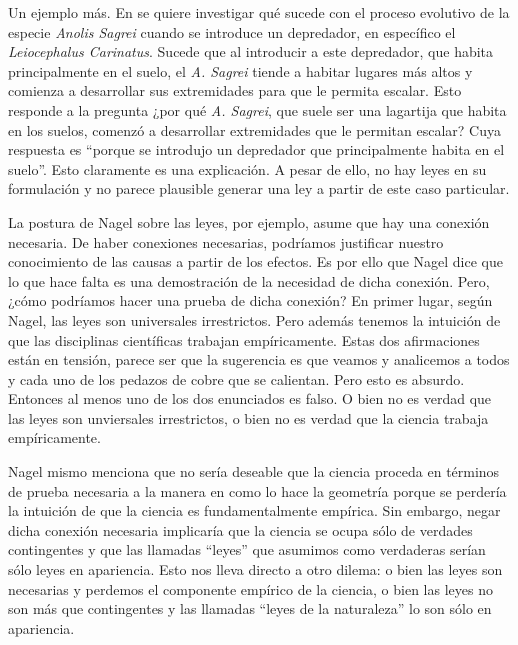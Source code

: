 Un ejemplo más. En \cite{Losos2004} se quiere investigar qué sucede con el proceso evolutivo de la especie \textit{Anolis Sagrei} cuando se introduce un depredador, en específico el \textit{Leiocephalus Carinatus}. Sucede que al introducir a este depredador, que habita principalmente en el suelo, el \textit{A. Sagrei} tiende a habitar lugares más altos y comienza a desarrollar sus extremidades para que le permita escalar. Esto responde a la pregunta ¿por qué \textit{A. Sagrei}, que suele ser una lagartija que habita en los suelos, comenzó a desarrollar extremidades que le permitan escalar? Cuya respuesta es ``porque se introdujo un depredador que principalmente habita en el suelo''. Esto claramente es una explicación. A pesar de ello, no hay leyes en su formulación y no parece plausible generar una ley a partir de este caso particular.

La postura de Nagel sobre las leyes, por ejemplo, asume que hay una conexión necesaria. De haber conexiones necesarias, podríamos justificar nuestro conocimiento de las causas a partir de los efectos. Es por ello que Nagel dice que lo que hace falta es una demostración de la necesidad de dicha conexión. Pero, ¿cómo podríamos hacer una prueba de dicha conexión? En primer lugar, según Nagel, las leyes son universales irrestrictos. Pero además tenemos la intuición de que las disciplinas científicas trabajan empíricamente. Estas dos afirmaciones están en tensión, parece ser que la sugerencia es que veamos y analicemos a todos y cada uno de los pedazos de cobre que se calientan. Pero esto es absurdo. Entonces al menos uno de los dos enunciados es falso. O bien no es verdad que las leyes son unviersales irrestrictos, o bien no es verdad que la ciencia trabaja empíricamente.

Nagel mismo menciona que no sería deseable que la ciencia proceda en términos de prueba necesaria a la manera en como lo hace la geometría \cite[cfr., p. 53]{Nagel2006} porque se perdería la intuición de que la ciencia es fundamentalmente empírica. Sin embargo, negar dicha conexión necesaria implicaría que la ciencia se ocupa sólo de verdades contingentes  y que las llamadas ``leyes'' que asumimos como verdaderas serían sólo leyes en apariencia. Esto nos lleva directo a otro dilema: o bien las leyes son necesarias y perdemos el componente empírico de la ciencia, o bien las leyes no son más que contingentes y las llamadas ``leyes de la naturaleza'' lo son sólo en apariencia.

